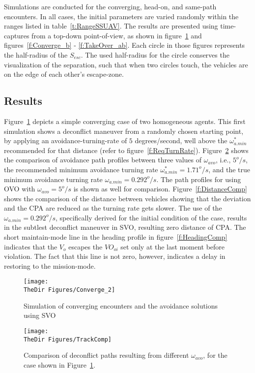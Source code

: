 Simulations are conducted for the converging, head-on, and same-path encounters. In all cases, the initial parameters are varied randomly within the ranges listed in table~\ref{t:RangeSSUAV}. The results are presented using time-captures from a top-down point-of-view, as shown in figure~\ref{f:Converge_a} and figures~\ref{f:Converge_b} - \ref{f:TakeOver_ab}. Each circle in those figures represents the half-radius of the $S_{esc}$. The used half-radius for the circle conserves the visualization of the separation, such that when two circles touch, the vehicles are on the edge of each other's escape-zone. 

\subsection{Results}
Figure~\ref{f:Converge_a} depicts a simple converging case of two homogeneous agents. This first simulation shows a deconflict maneuver from a randomly chosen starting point, by applying an avoidance-turning-rate of $5$ degrees/second, well above the $\omega_{a.min}^*$ recommended for that distance (refer to figure~\ref{f:ReqTurnRate}). Figure~\ref{f:TrackComp} shows the comparison of avoidance path profiles between three values of $\omega_{avo}$, i.e., $5^o/s$, the recommended minimum avoidance turning rate $\omega_{a.min}^*=1.71^o/s$, and the true minimum avoidance turning rate $\omega_{a.min} = 0.292^o/s$. The path profiles for using OVO with $\omega_{avo} = 5^o/s$ is shown as well for comparison.  Figure~\ref{f:DistanceComp} shows the comparison of the distance between vehicles showing that the deviation and the CPA are reduced as the turning rate gets slower. The use of the $\omega_{a.min} = 0.292^o/s$, specifically derived for the initial condition of the case, results in the subtlest deconflict maneuver in SVO, resulting zero distance of CPA. The short maintain-mode line in the heading profile in figure~\ref{f:HeadingComp} indicates that the $V_o$ escapes the $VO_{oi}$ set only at the last moment before violation. The fact that this line is not zero, however, indicates a delay in restoring to the mission-mode.

\begin{figure}[h!]
	\centering
	\texttt{[image: \\TheDir Figures/Converge\_2]}
	\caption{Simulation of converging encounters and the avoidance solutions using SVO}
	\label{f:Converge_a}
\end{figure}

\begin{figure}[h!]
	\texttt{[image: \\TheDir Figures/TrackComp]}
	\centering
	\caption{Comparison of deconflict paths resulting from different $\omega_{avo}$, for the case shown in Figure~\ref{f:Converge_a}.}
	\label{f:TrackComp}
\end{figure} 

